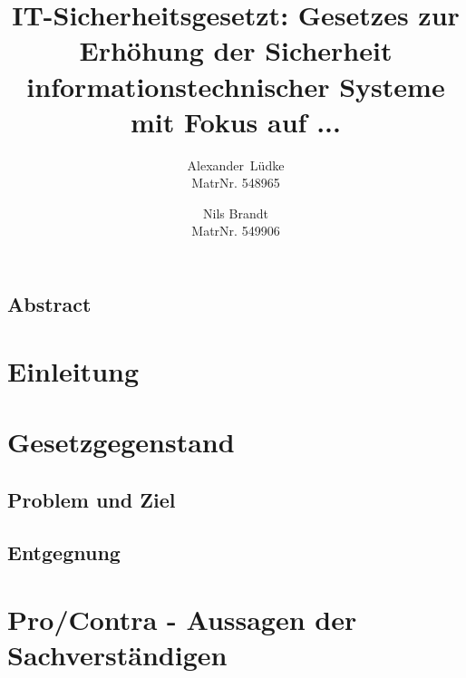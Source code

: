 \documentclass[letterpaper,twocolumn,10pt]{article}
\begin{document}
\date{}

\title{\Large \bf IT-Sicherheitsgesetzt: Gesetzes zur Erhöhung der Sicherheit  
informationstechnischer Systeme\\ mit Fokus auf ...}

\author{
{\rm Alexander\ Lüdke}\\
MatrNr. 548965
\and
{\rm Nils Brandt}\\
MatrNr. 549906
}

\maketitle

\thispagestyle{empty}


\subsection*{Abstract}

\section{Einleitung}

\section{Gesetzgegenstand}
	\subsection{Problem und Ziel}
	\subsection{Entgegnung}

\section{Pro/Contra - Aussagen der Sachverständigen}


{\footnotesize }
\end{document}
